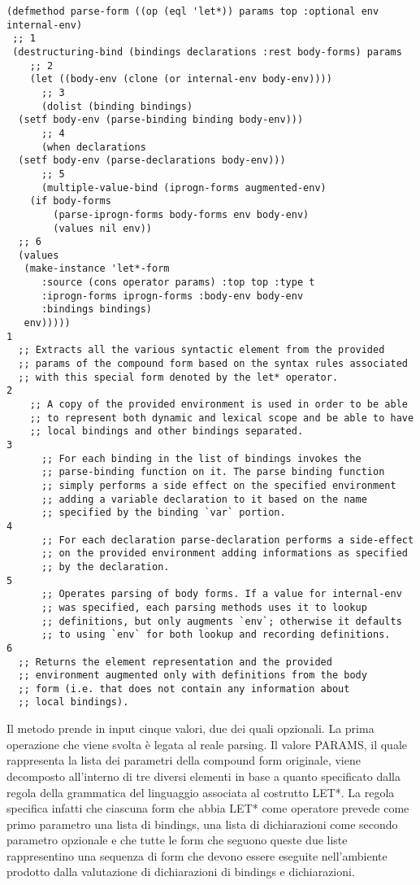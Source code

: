 \begin{lstlisting}
(defmethod parse-form ((op (eql 'let*)) params top :optional env internal-env)
 ;; 1
 (destructuring-bind (bindings declarations :rest body-forms) params
    ;; 2
    (let ((body-env (clone (or internal-env body-env))))
      ;; 3
      (dolist (binding bindings)
  (setf body-env (parse-binding binding body-env)))
      ;; 4
      (when declarations
  (setf body-env (parse-declarations body-env)))
      ;; 5
      (multiple-value-bind (iprogn-forms augmented-env)
    (if body-forms
        (parse-iprogn-forms body-forms env body-env)
        (values nil env))
  ;; 6
  (values
   (make-instance 'let*-form
      :source (cons operator params) :top top :type t
      :iprogn-forms iprogn-forms :body-env body-env
      :bindings bindings)
   env)))))
1
  ;; Extracts all the various syntactic element from the provided
  ;; params of the compound form based on the syntax rules associated
  ;; with this special form denoted by the let* operator.
2
    ;; A copy of the provided environment is used in order to be able
    ;; to represent both dynamic and lexical scope and be able to have
    ;; local bindings and other bindings separated.
3
      ;; For each binding in the list of bindings invokes the
      ;; parse-binding function on it. The parse binding function
      ;; simply performs a side effect on the specified environment
      ;; adding a variable declaration to it based on the name
      ;; specified by the binding `var` portion.
4
      ;; For each declaration parse-declaration performs a side-effect
      ;; on the provided environment adding informations as specified
      ;; by the declaration.
5
      ;; Operates parsing of body forms. If a value for internal-env
      ;; was specified, each parsing methods uses it to lookup
      ;; definitions, but only augments `env`; otherwise it defaults
      ;; to using `env` for both lookup and recording definitions.
6
  ;; Returns the element representation and the provided
  ;; environment augmented only with definitions from the body
  ;; form (i.e. that does not contain any information about
  ;; local bindings).
\end{lstlisting}

Il metodo prende in input cinque valori, due dei quali opzionali. La prima
operazione che viene svolta è legata al reale parsing. Il valore PARAMS, il
quale rappresenta la lista dei parametri della compound form originale, viene
decomposto all’interno di tre diversi elementi in base a quanto specificato
dalla regola della grammatica del linguaggio associata al costrutto LET*. La
regola specifica infatti che ciascuna form che abbia LET* come operatore
prevede come primo parametro una lista di bindings, una lista di dichiarazioni
come secondo parametro opzionale e che tutte le form che seguono queste due
liste rappresentino una sequenza di form che devono essere eseguite
nell’ambiente prodotto dalla valutazione di dichiarazioni di bindings e
dichiarazioni.\\

